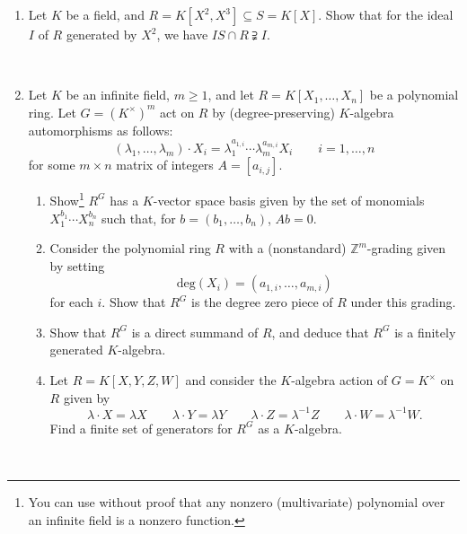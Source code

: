 \documentclass[12pt]{amsart}
\begin{document}
\begin{enumerate}



\item Let $K$ be a field, and $R=K[X^2,X^3] \subseteq S=K[X]$. Show that for the ideal $I$ of $R$ generated by $X^2$, we have $I S \cap R \supsetneqq I$. %

\

\item Let $K$ be an infinite field, $m \geqslant 1$, and let $R = K[X_1,\dots, X_n]$ be a polynomial ring. Let $G= (K^\times)^m$ act on $R$ by (degree-preserving) $K$-algebra automorphisms as follows: 
\[ 
 (\lambda_1,\dots,\lambda_m) \cdot X_i = \lambda_1^{a_{1,i}} \cdots  \lambda_m^{a_{m,i}} X_i \qquad  {i=1,\dots,n} 
 \]
 for some $m \times n$ matrix of integers $A=[a_{i,j}]$.
\begin{enumerate}
\item Show\footnote{You can use without proof that any nonzero (multivariate) polynomial over an infinite field is a nonzero function.} $R^G$ has a $K$-vector space basis given by the set of monomials $X_1^{b_1} \cdots X_n^{b_n}$ such that, for $b=(b_1,\dots,b_n)$, $Ab=0$.
\item Consider the polynomial ring $R$ with a (nonstandard) $\mathbb{Z}^m$-grading given by setting 
\[\textrm{deg}(X_i) = (a_{1,i},\dots,a_{m,i})\] 
for each $i$. Show that $R^G$ is the degree zero piece of $R$ under this grading.
\item Show that $R^G$ is a direct summand of $R$, and deduce that $R^G$ is a finitely generated $K$-algebra.
\item Let $R = K[X,Y,Z,W]$ and consider the $K$-algebra action of $G = K^\times$ on $R$ given by
\[\lambda \cdot X = \lambda X \qquad \lambda \cdot Y = \lambda Y \qquad \lambda \cdot Z = \lambda^{-1} Z \qquad \lambda \cdot W = \lambda^{-1} W.\]
Find a finite set of generators for $R^G$ as a $K$-algebra.
\end{enumerate}

\hrulefill

\


\end{enumerate}
\end{document}
